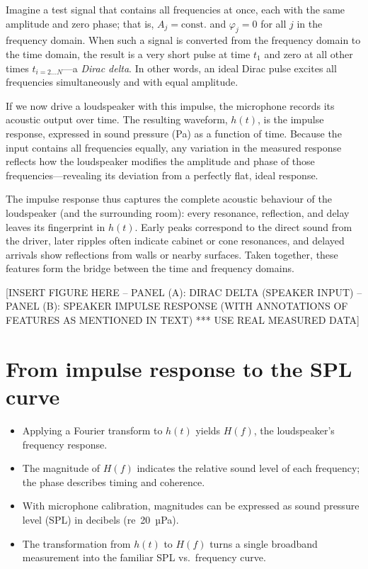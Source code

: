 \documentclass[12pt,a4paper]{article}
\begin{document}
Imagine a test signal that contains all frequencies at once, each with the same amplitude and zero phase; that is, $A_j = \text{const.}$ and $\varphi_j = 0$ for all $j$ in the frequency domain.  
When such a signal is converted from the frequency domain to the time domain, the result is a very short pulse at time $t_1$ and zero at all other times $t_{i = 2\ldots N}$—a \emph{Dirac delta}.  
In other words, an ideal Dirac pulse excites all frequencies simultaneously and with equal amplitude.

If we now drive a loudspeaker with this impulse, the microphone records its acoustic output over time.  
The resulting waveform, $h(t)$, is the impulse response, expressed in sound pressure (Pa) as a function of time.  
Because the input contains all frequencies equally, any variation in the measured response reflects how the loudspeaker modifies the amplitude and phase of those frequencies—revealing its deviation from a perfectly flat, ideal response.

The impulse response thus captures the complete acoustic behaviour of the loudspeaker (and the surrounding room): every resonance, reflection, and delay leaves its fingerprint in $h(t)$.  
Early peaks correspond to the direct sound from the driver, later ripples often indicate cabinet or cone resonances, and delayed arrivals show reflections from walls or nearby surfaces.  
Taken together, these features form the bridge between the time and frequency domains.


[INSERT FIGURE HERE -- PANEL (A): DIRAC DELTA (SPEAKER INPUT) -- PANEL (B): SPEAKER IMPULSE RESPONSE (WITH ANNOTATIONS OF FEATURES AS MENTIONED IN TEXT) *** USE REAL MEASURED DATA]


\section{From impulse response to the SPL curve}

\begin{itemize}[noitemsep]
    \item Applying a Fourier transform to \(h(t)\) yields \(H(f)\), the loudspeaker’s frequency response.
    \item The magnitude of \(H(f)\) indicates the relative sound level of each frequency; the phase describes timing and coherence.
    \item With microphone calibration, magnitudes can be expressed as sound pressure level (SPL) in decibels (re~20~µPa).
    \item The transformation from \(h(t)\) to \(H(f)\) turns a single broadband measurement into the familiar SPL vs.\ frequency curve.
\end{itemize}
\end{document}
